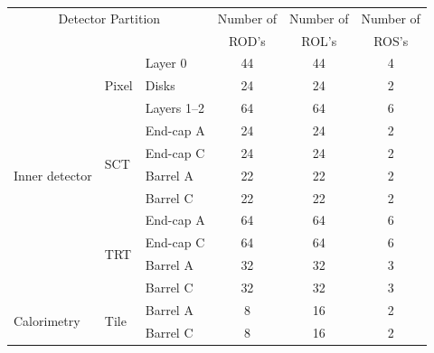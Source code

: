 	\begin {table}[h!]
	\begin{center}
		\begin{tabular}{ | l | l | l | c | c | c | }%
		\hline
\multicolumn{3}{|c|}{Detector Partition}											& Number of & Number of & Number of \\%
\multicolumn{3}{|c|}{ }																& ROD’s 	& ROL’s 	& ROS’s 	\\%
		\hline
\multirow{11}{*}{Inner detector} 	& \multirow{3}{*}{Pixel} 	& Layer 0 			& 44 		& 44 		& 4 		\\%
									&  							& Disks 			& 24 		& 24 		& 2 		\\%
									&							& Layers 1–2 		& 64 		& 64 		& 6 		\\%
									\cline{2-6}
									& \multirow{4}{*}{SCT}		& End-cap A 		& 24 		& 24 		& 2 		\\%
									& 							& End-cap C 		& 24 		& 24 		& 2 		\\%
									& 							& Barrel A 			& 22 		& 22 		& 2 		\\%
									& 							& Barrel C 			& 22 		& 22 		& 2 		\\%
									\cline{2-6}
									& \multirow{4}{*}{TRT}		& End-cap A 		& 64 		& 64 		& 6 		\\%
									& 							& End-cap C 		& 64 		& 64 		& 6 		\\%
									& 							& Barrel A 			& 32 		& 32 		& 3 		\\%
									& 							& Barrel C 			& 32 		& 32 		& 3 		\\%
		\hline
\multirow{10}{*}{Calorimetry}		& \multirow{4}{*}{Tile}		& Barrel A 			& 8 		& 16 		& 2 		\\%
									& 							& Barrel C 			& 8 		& 16 		& 2 		\\%

\end{tabular}
\end{center}
\end{table}

